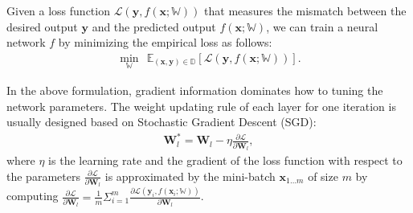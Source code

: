\documentclass[twocolumn]{article}
\begin{document}
Given a loss function $\mathcal{L}(\mathbf{y}, f(\mathbf{x}; \mathbb{W}))$ that measures the mismatch between the desired output $\mathbf{y}$ and the predicted output $f(\mathbf{x}; \mathbb{W})$, we can train a neural network $f$ by minimizing the empirical loss as follows:
%
 \begin{eqnarray}
\label{eqn:optimization_normal}
	 \min_{\mathbb{W}} ~~\mathbb{E}_{(\mathbf{x},\mathbf{y})\in \mathbb{D}} [\mathcal{L}(\mathbf{y}, f(\mathbf{x}; \mathbb{W}))].
\end{eqnarray}

In the above formulation, gradient information dominates how to tuning the network parameters. The weight updating rule of each layer for one iteration is usually designed based on Stochastic Gradient Descent (SGD):
\begin{eqnarray}
\label{eqn:update_normal}
	 \mathbf{W}^{*}_{l}=\mathbf{W}_{l} - \eta \frac{\partial \mathcal{L} }{\partial \mathbf{W}_{l}},
\end{eqnarray}
where $\eta$ is the learning rate and the gradient of the loss function with respect to the parameters $\frac{\partial \mathcal{L} }{\partial \mathbf{W}_{l}}$ is approximated by the mini-batch $\mathbf{x}_{1\ldots m}$ of size $m$ by computing $\frac{\partial \mathcal{L} }{\partial \mathbf{W}_{l}}= \frac{1}{m} \Sigma_{i=1}^{m} \frac{\partial \mathcal{L}(\mathbf{y}_i, f(\mathbf{x}_i; \mathbb{W}))}{\partial \mathbf{W}_{l}}$.
\end{document}
